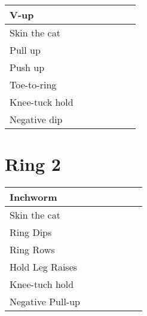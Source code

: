 \documentclass{article}
\begin{document}
\begin{landscape}
\noindent\begin{tabularx}{\columnwidth}{ |l|*{6}{R|} }
  \hline
  V-up                             &&&&&&    \\
  \hline
  Skin the cat                     &&&&&&    \\
  \hline
  Pull up                          &&&&&&    \\
  \hline
  Push up                          &&&&&&    \\
  \hline
  Toe-to-ring                      &&&&&&    \\
  \hline
  Knee-tuck hold                   &&&&&&    \\
  \hline
  Negative dip                     &&&&&&    \\
  \hline
\end{tabularx}



\section*{Ring 2}

\noindent\begin{tabularx}{\columnwidth}{ |l|*{6}{R|} }
  \hline
  Inchworm                         &&&&&&    \\
  \hline                                        
  Skin the cat                     &&&&&&    \\
  \hline                                        
  Ring Dips                        &&&&&&    \\
  \hline                                        
  Ring Rows                        &&&&&&    \\
  \hline                                        
  Hold Leg Raises                  &&&&&&    \\
  \hline                                        
  Knee-tuch hold                   &&&&&&    \\
  \hline                                        
  Negative Pull-up                 &&&&&&    \\
  \hline
\end{tabularx}

\end{landscape}
\end{document}
